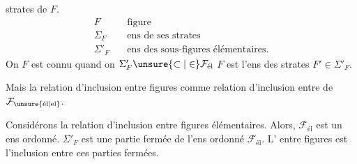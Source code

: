 strates de $F$. 
\[
\begin{aligned}
 F &\quad \text{figure}\\
 \Sigma_F &\quad \text{ens de ses strates}\\
 \Sigma'_F &\quad \text{ens des sous-figures élémentaires.}
\end{aligned}
\]
On 
$F$ est connu quand on  $\Sigma'_F\unsure{\subset|\in}\mathcal{F}_{\text{él}}$  $F$ est l'ens des strates  $F'\in\Sigma'_F$.

Mais la relation d'inclusion entre figures  comme relation d'inclusion entre  de $\mathcal{F}_{\unsure{\text{él}|\text{el}}}$.


Considérons la relation d'inclusion \inserted{$\leq$} entre figures élémentaires. Alors, $\mathcal{F}_{\text{él}}$ est un ens ordonné.     $\Sigma'_F$ est une partie fermée de l'ens ordonné $\mathcal{F}_{\text{él}}$. L' entre figures est l'inclusion entre ces parties fermées.
